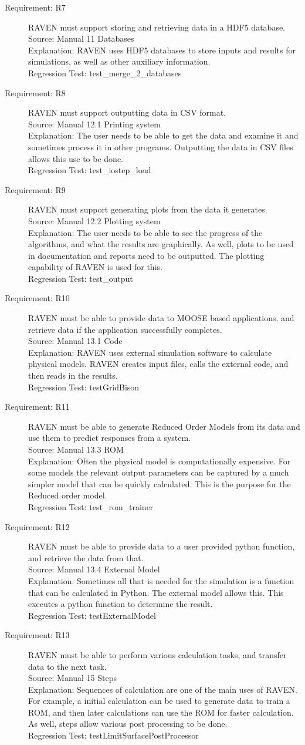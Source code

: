 \documentclass{article}
\newcommand{\requirement}[5]{\item[Requirement: #1] #2 \\Source: #3\\Explanation: #4\\Regression Test: #5}
\begin{document}
\begin{description}
\requirement{R7}{RAVEN must support storing and retrieving data in a HDF5 database.}
{Manual 11 Databases}
{RAVEN uses HDF5 databases to store inputs and results for simulations, as well as other auxiliary information.}
{test\_merge\_2\_databases}

\requirement{R8}{RAVEN must support outputting data in CSV format.}
{Manual 12.1 Printing system}
{The user needs to be able to get the data and examine it and sometimes process it in other programs.  Outputting the data in CSV files allows this use to be done.}
{test\_iostep\_load}

\requirement{R9}{RAVEN must support generating plots from the data it generates.}
{Manual 12.2 Plotting system}
{The user needs to be able to see the progress of the algorithms, and what the results are graphically.  As well, plots to be used in documentation and reports need to be outputted.  The plotting capability of RAVEN is used for this.}
{test\_output}

\requirement{R10}{RAVEN must be able to provide data to MOOSE based applications, and retrieve data if the application successfully completes.}
{Manual 13.1 Code}
{RAVEN uses external simulation software to calculate physical models.  RAVEN creates input files, calls the external code, and then reads in the results.}
{testGridBison}

\requirement{R11}{RAVEN must be able to generate Reduced Order Models from its data and use them to predict responses from a system.}
{Manual 13.3 ROM}
{Often the physical model is computationally expensive.  For some models the relevant output parameters can be captured by a much simpler model that can be quickly calculated.  This is the purpose for the Reduced order model.}
{test\_rom\_trainer}

\requirement{R12}{RAVEN must be able to provide data to a user provided python function, and retrieve the data from that.}
{Manual 13.4 External Model}
{Sometimes all that is needed for the simulation is a function that can be calculated in Python.  The external model allows this.  This executes a python function to determine the result.}
{testExternalModel}

\requirement{R13}{RAVEN must be able to perform various calculation tasks, and transfer data to the next task.}
{Manual 15 Steps}
{Sequences of calculation are one of the main uses of RAVEN.  For example, a initial calculation can be used to generate data to train a ROM, and then later calculations can use the ROM for faster calculation.  As well, steps allow various post processing to be done.}
{testLimitSurfacePostProcessor}

\end{description}
\end{document}
